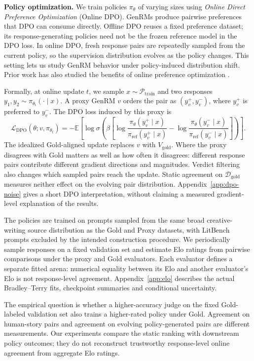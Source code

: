 \documentclass[11pt,letterpaper]{article}
\begin{document}
\textbf{Policy optimization.} We train policies $\pi_\theta$ of varying sizes using \emph{Online Direct Preference Optimization} (Online DPO). GenRMs produce pairwise preferences that DPO can consume directly. Offline DPO reuses a fixed preference dataset; its response-generating policies need not be the frozen reference model in the DPO loss. In online DPO, fresh response pairs are repeatedly sampled from the current policy, so the supervision distribution evolves as the policy changes. This setting lets us study GenRM behavior under policy-induced distribution shift. Prior work has also studied the benefits of online preference optimization \citep{guo2024direct}.

Formally, at online update $t$, we sample $x \sim \mathcal{P}_{\text{train}}$ and two responses $y_1,y_2 \sim \pi_{\theta_t}(\cdot\mid x)$. A proxy GenRM $v$ orders the pair as $(y_v^+,y_v^-)$, where $y_v^+$ is preferred to $y_v^-$. The DPO loss induced by this proxy is
\[
\mathcal{L}_{\text{DPO}}(\theta; v, \pi_{\theta_t})
=
-\mathbb{E}\left[
\log \sigma\left(
\beta
\left[
\log \frac{\pi_\theta(y_v^+\mid x)}{\pi_{\text{ref}}(y_v^+\mid x)}
-
\log \frac{\pi_\theta(y_v^-\mid x)}{\pi_{\text{ref}}(y_v^-\mid x)}
\right]
\right)
\right].
\]
The idealized Gold-aligned update replaces $v$ with $V_{\text{gold}}$. Where the proxy disagrees with Gold matters as well as how often it disagrees: different response pairs contribute different gradient directions and magnitudes. Verdict filtering also changes which sampled pairs reach the update. Static agreement on $\mathcal{D}_{\text{gold}}$ measures neither effect on the evolving pair distribution. Appendix~\ref{app:dpo-noise} gives a short DPO interpretation, without claiming a measured gradient-level explanation of the results.

The policies are trained on prompts sampled from the same broad creative-writing source distribution as the Gold and Proxy datasets, with LitBench prompts excluded by the intended construction procedure. We periodically sample responses on a fixed validation set and estimate Elo ratings from pairwise comparisons under the proxy and Gold evaluators. Each evaluator defines a separate fitted arena: numerical equality between its Elo and another evaluator's Elo is not response-level agreement. Appendix~\ref{app:elo} describes the actual Bradley--Terry fits, checkpoint summaries and conditional uncertainty.

The empirical question is whether a higher-accuracy judge on the fixed Gold-labeled validation set also trains a higher-rated policy under Gold. Agreement on human-story pairs and agreement on evolving policy-generated pairs are different measurements. Our experiments compare the static ranking with downstream policy outcomes; they do not reconstruct trustworthy response-level online agreement from aggregate Elo ratings.
\end{document}
